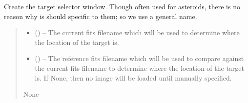 \documentclass[letterpaper,11pt,english]{sphinxmanual}
\begin{document}
\begin{savenotes}
\begin{fulllineitems}
\begin{savenotes}\begin{fulllineitems}
\label{\detokenize{code/opihiexarata.gui.selector:opihiexarata.gui.selector.TargetSelectorWindow.__init__}}
\pysigstartsignatures
{}
\pysigstopsignatures
\sphinxAtStartPar
Create the target selector window. Though often used for asteroids,
there is no reason why is should specific to them; so we use a general
name.
\begin{quote}\begin{description}
\begin{itemize}
\item {} 
\sphinxAtStartPar
{} () – The current fits filename which will be used to determine where the
location of the target is.

\item {} 
\sphinxAtStartPar
{} (\sphinxstyleliteralemphasis{\sphinxupquote{, }}) – The reference fits filename which will be used to compare against the
current fits filename to determine where the location of the target
is. If None, then no image will be loaded until manually specified.

\end{itemize}

\sphinxAtStartPar
None

\end{description}\end{quote}

\end{fulllineitems}\end{savenotes}



\end{fulllineitems}
\end{savenotes}
\end{document}
